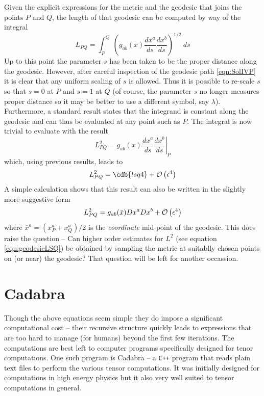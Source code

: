 \documentclass[a4paper,12pt]{article}
\numberwithin{equation}{section}
\begin{document}
Given the explicit expressions for the metric and the geodesic that joins the points $P$ and
$Q$, the length of that geodesic can be computed by way of the integral
\[
L_{PQ} = \int_P^Q\>\left(g_{ab}(x)\frac{dx^a}{ds}\frac{dx^b}{ds}\right)^{1/2}\>ds
\]
Up to this point the parameter $s$ has been taken to be the proper distance along the
geodesic. However, after careful inspection of the geodesic path \eqref{eqn:SolIVP} it is
clear that any uniform scaling of $s$ is allowed. Thus it is possible to re-scale $s$ so
that $s=0$ at $P$ and $s=1$ at $Q$ (of course, the parameter $s$ no longer measures proper
distance so it may be better to use a different symbol, say $\lambda$). Furthermore, a
standard result states that the integrand is constant along the geodesic and can thus be
evaluated at any point such as $P$. The integral is now trivial to evaluate with the result
\[
L^2_{PQ} = \left.g_{ab}(x)\frac{dx^a}{ds}\frac{dx^b}{ds}\right\vert_{P}
\]
which, using previous results, leads to
%
\begin{dmath*}L^2_{PQ} = \cdb{lsq4} + \BigO{\eps^4}\end{dmath*}
%
A simple calculation shows that this result can also be written in the slightly more
suggestive form
\[
L^2_{PQ} = g_{ab}(\bar x) Dx^a Dx^b + \mathcal{O}\left(\epsilon^4\right)
\]
where ${\bar x}^a = (x^a_P+x^a_Q)/2$ is the \emph{coordinate} mid-point of the geodesic.
This does raise the question -- Can higher order estimates for $L^2$ (see equation
\ref{eqn:geodesicLSQ}) be obtained by sampling the metric at suitablly chosen points on
(or near) the geodesic? That question will be left for another occassion.

\section{Cadabra}\label{sec:Cadabra}

Though the above equations seem simple they do impose a significant computational cost --
their recursive structure quickly leads to expressions that are too hard to manage (for
humans) beyond the first few iterations. The computations are best left to computer programs
specifically designed for tenor computations. One such program is Cadabra -- a {\tt C++}
program that reads plain text files to perform the various tensor computations. It was
initially designed for computations in high energy physics but it also very well suited to
tensor computations in general.
\end{document}
